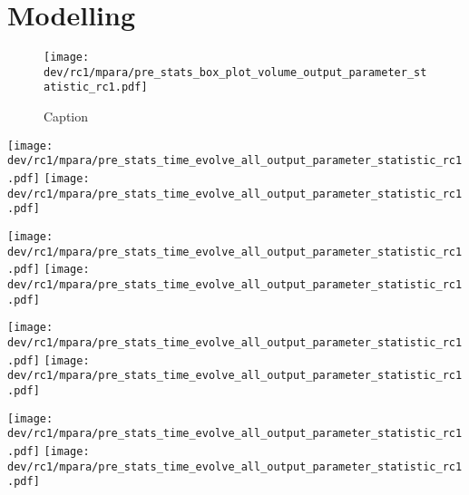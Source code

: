 \chapter{Modelling} %
\label{app:modelAnalysis}
%
%
% 
%
\begin{figure}[!h]
    \centering
    \texttt{[image: dev/rc1/mpara/pre\_stats\_box\_plot\_volume\_output\_parameter\_statistic\_rc1.pdf]}
    \caption{Caption}
    \label{app:appModelVolumeBoxPlot}
\end{figure}
%
%
% 
%
%
\setlength{\tikzwidth}{\textwidth}
\begin{sidewaysfigure}[!h]
\centering
\texttt{[image: dev/rc1/mpara/pre\_stats\_time\_evolve\_all\_output\_parameter\_statistic\_rc1.pdf]}
\texttt{[image: dev/rc1/mpara/pre\_stats\_time\_evolve\_all\_output\_parameter\_statistic\_rc1.pdf]}
\label{app:pste1}
\end{sidewaysfigure}
%
\begin{sidewaysfigure}[!h]
\centering
\texttt{[image: dev/rc1/mpara/pre\_stats\_time\_evolve\_all\_output\_parameter\_statistic\_rc1.pdf]}
\texttt{[image: dev/rc1/mpara/pre\_stats\_time\_evolve\_all\_output\_parameter\_statistic\_rc1.pdf]}
\label{app:pste2}
\end{sidewaysfigure}
%
\begin{sidewaysfigure}[!h]
\centering
\texttt{[image: dev/rc1/mpara/pre\_stats\_time\_evolve\_all\_output\_parameter\_statistic\_rc1.pdf]}
\texttt{[image: dev/rc1/mpara/pre\_stats\_time\_evolve\_all\_output\_parameter\_statistic\_rc1.pdf]}
\label{app:pste3}
\end{sidewaysfigure}
%
\begin{sidewaysfigure}[!h]
\centering
\texttt{[image: dev/rc1/mpara/pre\_stats\_time\_evolve\_all\_output\_parameter\_statistic\_rc1.pdf]}
\texttt{[image: dev/rc1/mpara/pre\_stats\_time\_evolve\_all\_output\_parameter\_statistic\_rc1.pdf]}
\label{app:pste4}
\end{sidewaysfigure}

